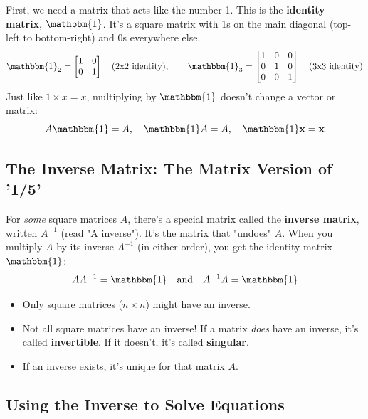 \documentclass[11pt]{article}
\newcommand{\x}{\mathbf{x}}
\newcommand{\id}{\mathbbm{1}}
\begin{document}
First, we need a matrix that acts like the number 1. This is the \textbf{identity matrix}, $\id$. It's a square matrix with 1s on the main diagonal (top-left to bottom-right) and 0s everywhere else.
\[ \id_2 = \begin{bmatrix} 1 & 0 \\ 0 & 1 \end{bmatrix} \quad \text{(2x2 identity)}, \qquad \id_3 = \begin{bmatrix} 1 & 0 & 0 \\ 0 & 1 & 0 \\ 0 & 0 & 1 \end{bmatrix} \quad \text{(3x3 identity)} \]
Just like $1 \times x = x$, multiplying by $\id$ doesn't change a vector or matrix:
\[ A \id = A, \quad \id A = A, \quad \id \x = \x \]

\subsection{The Inverse Matrix:  The Matrix Version of '1/5'}

For \textit{some} square matrices $A$, there's a special matrix called the \textbf{inverse matrix}, written $A^{-1}$ (read "A inverse"). It's the matrix that "undoes" $A$. When you multiply $A$ by its inverse $A^{-1}$ (in either order), you get the identity matrix $\id$:
\[ A A^{-1} = \id \quad \text{and} \quad A^{-1} A = \id \]

\begin{remark}
\begin{itemize}
    \item Only square matrices ($n \times n$) might have an inverse.
    \item Not all square matrices have an inverse! If a matrix \textit{does} have an inverse, it's called \textbf{invertible}. If it doesn't, it's called \textbf{singular}.
    \item If an inverse exists, it's unique for that matrix $A$.
\end{itemize}
\end{remark}

\subsection{Using the Inverse to Solve Equations}
\end{document}

